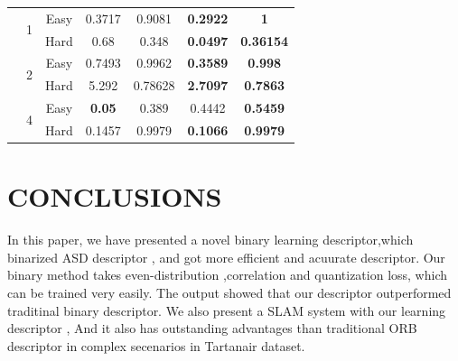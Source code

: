 \documentclass[conference]{IEEEtran}
\begin{document}
\begin{table}[h]
\begin{center}
\begin{tabular}{ccccccc}
                                   &  \multirow{2}{*}{1}   &  \multicolumn{1}{c}{Easy}  & \multicolumn{1}{c}{0.3717} & \multicolumn{1}{c}{0.9081} & \multicolumn{1}{c}{\textbf{0.2922}}  & \multicolumn{1}{c}{\textbf{1}}   \\
  \cline{3-7}
                                                          & \multicolumn{1}{c}{} &  \multicolumn{1}{c}{Hard}  & \multicolumn{1}{c}{0.68} & \multicolumn{1}{c}{0.348} & \multicolumn{1}{c}{\textbf{0.0497}}  & \multicolumn{1}{c}{\textbf{0.36154}}   \\
  \cline{2-7}
                                    &  \multirow{2}{*}{2}   &  \multicolumn{1}{c}{Easy}  & \multicolumn{1}{c}{0.7493} & \multicolumn{1}{c}{0.9962} & \multicolumn{1}{c}{\textbf{0.3589}}  & \multicolumn{1}{c}{\textbf{0.998}}   \\
  \cline{3-7}
                                                          & \multicolumn{1}{c}{} &  \multicolumn{1}{c}{Hard}  & \multicolumn{1}{c}{5.292} & \multicolumn{1}{c}{0.78628} & \multicolumn{1}{c}{\textbf{2.7097}}  & \multicolumn{1}{c}{\textbf{0.7863}}   \\
  \cline{2-7}
                                    &  \multirow{2}{*}{4}   &  \multicolumn{1}{c}{Easy}  & \multicolumn{1}{c}{\textbf{0.05}} & \multicolumn{1}{c}{0.389} & \multicolumn{1}{c}{0.4442}  & \multicolumn{1}{c}{\textbf{0.5459}}   \\
  \cline{3-7}
                                                          & \multicolumn{1}{c}{} &  \multicolumn{1}{c}{Hard}  & \multicolumn{1}{c}{0.1457} & \multicolumn{1}{c}{0.9979} & \multicolumn{1}{c}{\textbf{0.1066}}  & \multicolumn{1}{c}{\textbf{0.9979}}   \\

\midrule
\toprule
\end{tabular} 
\end{center}
\end{table}
\vspace{-0.47cm}


\section{CONCLUSIONS}

In this paper, we have presented a novel binary learning descriptor,which binarized ASD descriptor , and got more efficient and acuurate descriptor. Our binary method takes even-distribution ,correlation and quantization loss, which can be trained very easily. The output showed that our descriptor outperformed traditinal binary descriptor. We also present a SLAM system with our learning descriptor , And it also has outstanding advantages than traditional ORB descriptor in complex secenarios in Tartanair dataset.
\end{document}
